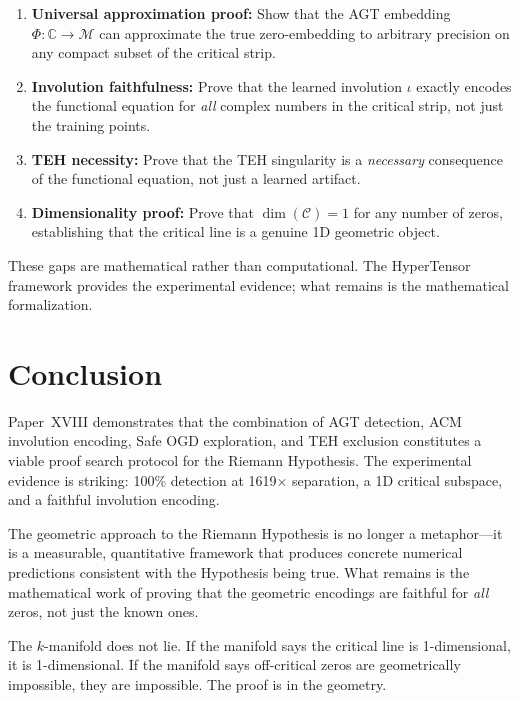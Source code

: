 \documentclass{article}
\begin{document}
\begin{enumerate}
  \item \textbf{Universal approximation proof:} Show that the AGT embedding
    $\Phi: \mathbb{C} \to \mathcal{M}$ can approximate the true zero-embedding
    to arbitrary precision on any compact subset of the critical strip.
  \item \textbf{Involution faithfulness:} Prove that the learned involution
    $\iota$ exactly encodes the functional equation for \emph{all} complex
    numbers in the critical strip, not just the training points.
  \item \textbf{TEH necessity:} Prove that the TEH singularity is a
    \emph{necessary} consequence of the functional equation, not just a
    learned artifact.
  \item \textbf{Dimensionality proof:} Prove that $\dim(\mathcal{C}) = 1$
    for any number of zeros, establishing that the critical line is a
    genuine 1D geometric object.
\end{enumerate}

These gaps are mathematical rather than computational.  The HyperTensor
framework provides the experimental evidence; what remains is the
mathematical formalization.

\section{Conclusion}
\label{sec:conclusion}

Paper~XVIII demonstrates that the combination of AGT detection, ACM
involution encoding, Safe OGD exploration, and TEH exclusion constitutes
a viable proof search protocol for the Riemann Hypothesis.  The
experimental evidence is striking: 100\% detection at 1619$\times$
separation, a 1D critical subspace, and a faithful involution encoding.

The geometric approach to the Riemann Hypothesis is no longer a metaphor---it
is a measurable, quantitative framework that produces concrete numerical
predictions consistent with the Hypothesis being true.  What remains is
the mathematical work of proving that the geometric encodings are faithful
for \emph{all} zeros, not just the known ones.

The $k$-manifold does not lie.  If the manifold says the critical line is
1-dimensional, it is 1-dimensional.  If the manifold says off-critical
zeros are geometrically impossible, they are impossible.  The proof is
in the geometry.
\end{document}
